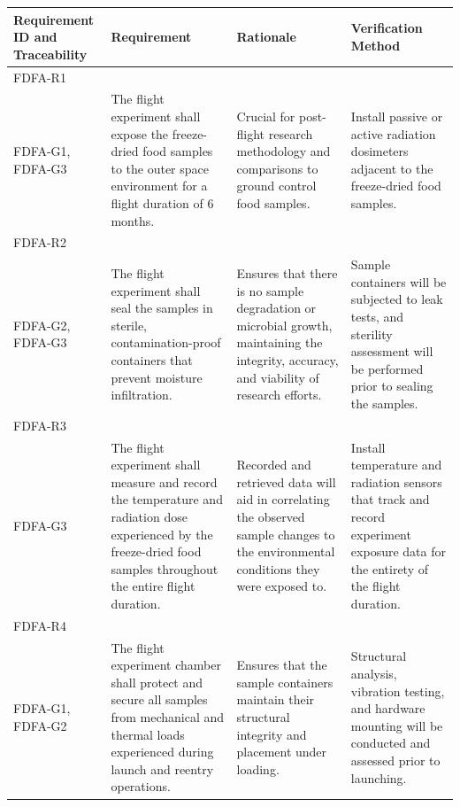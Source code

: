 \documentclass[conf]{new-aiaa}
\begin{document}
\begin{table}[H]
    \centering
    \footnotesize
    \setlength{\tabcolsep}{4pt}
    \renewcommand{\arraystretch}{1.15}
    \begin{tabularx}{\textwidth}{@{}>{\raggedright\arraybackslash}m{2.4cm}YYY@{}}
    \toprule
    \textbf{Requirement ID and Traceability} & \textbf{Requirement} & \textbf{Rationale} & \textbf{Verification Method} \\
    \midrule
    FDFA-R1\\FDFA-G1, FDFA-G3 &
    The flight experiment shall expose the freeze-dried food samples to the outer space environment for a flight duration of 6 months. &
    Crucial for post-flight research methodology and comparisons to ground control food samples. &
    Install passive or active radiation dosimeters adjacent to the freeze-dried food samples. \\ \hline

    FDFA-R2\\FDFA-G2, FDFA-G3 &
    The flight experiment shall seal the samples in sterile, contamination-proof containers that prevent moisture infiltration. &
    Ensures that there is no sample degradation or microbial growth, maintaining the integrity, accuracy, and viability of research efforts. &
    Sample containers will be subjected to leak tests, and sterility assessment will be performed prior to sealing the samples. \\ \hline

    FDFA-R3\\FDFA-G3 &
    The flight experiment shall measure and record the temperature and radiation dose experienced by the freeze-dried food samples throughout the entire flight duration. &
    Recorded and retrieved data will aid in correlating the observed sample changes to the environmental conditions they were exposed to. &
    Install temperature and radiation sensors that track and record experiment exposure data for the entirety of the flight duration. \\ \hline

    FDFA-R4\\FDFA-G1, FDFA-G2 &
    The flight experiment chamber shall protect and secure all samples from mechanical and thermal loads experienced during launch and reentry operations. &
    Ensures that the sample containers maintain their structural integrity and placement under loading. &
    Structural analysis, vibration testing, and hardware mounting will be conducted and assessed prior to launching. \\ \hline


\end{tabularx}
\end{table}
\end{document}
